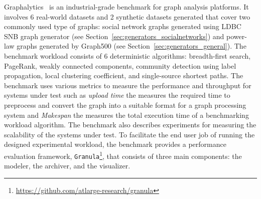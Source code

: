 Graphalytics~\cite{Iosup:2016:LGB:3007263.3007270} is an industrial-grade benchmark for graph analysis platforms. It involves 6 real-world datasets and 2 synthetic datasets generated that cover two commonly used type of graphs: social network graphs generated using LDBC SNB graph generator (see Section~\ref{sec:generators_socialnetworks}) and power-law graphs generated by Graph500 (see Section~\ref{sec:generators_general}). The benchmark workload consists of 6 deterministic algorithms: breadth-first search, PageRank, weakly connected components, community detection using label propagation, local clustering coefficient, and single-source shortest paths. The benchmark uses various metrics to measure the performance and throughput for systems under test such as \emph{upload time} the measures the required time to preprocess and convert the graph into a suitable format for a graph processing system and \emph{Makespan} the measures the total  execution time of a benchmarking workload algorithm. The benchmark also describes experiments for measuring the scalability of the systems under test. To facilitate the end user job of running the designed experimental workload, the benchmark provides  a performance evaluation framework, \texttt{Granula}\footnote{\url{https://github.com/atlarge-research/granula}}, that consists of three main components: the modeler, the archiver, and the visualizer.


